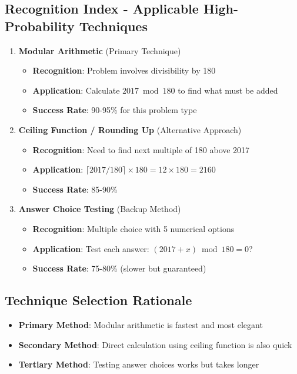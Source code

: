 \documentclass[]{article}
\begin{document}
\begin{techniquesbox}
\subsection*{Recognition Index - Applicable High-Probability Techniques}

\begin{enumerate}[leftmargin=*]
    \item \textbf{Modular Arithmetic} (Primary Technique)
    \begin{itemize}
        \item \textbf{Recognition}: Problem involves divisibility by 180
        \item \textbf{Application}: Calculate $2017 \bmod 180$ to find what must be added
        \item \textbf{Success Rate}: 90-95\% for this problem type
    \end{itemize}
    
    \item \textbf{Ceiling Function / Rounding Up} (Alternative Approach)
    \begin{itemize}
        \item \textbf{Recognition}: Need to find next multiple of 180 above 2017
        \item \textbf{Application}: $\lceil 2017/180 \rceil \times 180 = 12 \times 180 = 2160$
        \item \textbf{Success Rate}: 85-90\%
    \end{itemize}
    
    \item \textbf{Answer Choice Testing} (Backup Method)
    \begin{itemize}
        \item \textbf{Recognition}: Multiple choice with 5 numerical options
        \item \textbf{Application}: Test each answer: $(2017 + x) \bmod 180 = 0$?
        \item \textbf{Success Rate}: 75-80\% (slower but guaranteed)
    \end{itemize}
\end{enumerate}

\subsection*{Technique Selection Rationale}
\begin{itemize}[leftmargin=*]
    \item \textbf{Primary Method}: Modular arithmetic is fastest and most elegant
    \item \textbf{Secondary Method}: Direct calculation using ceiling function is also quick
    \item \textbf{Tertiary Method}: Testing answer choices works but takes longer
\end{itemize}


\end{techniquesbox}
\end{document}
